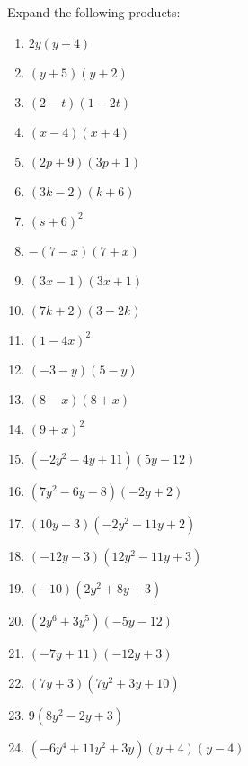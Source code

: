 \begin{exercises}{}
{
Expand the following products:
\begin{multicols}{2}
\begin{enumerate}[label=\textbf{\arabic*}., itemsep=5pt]
\item $2y(y+4)$ 
\item $(y+5)(y+2) $
\item $(2-t)(1-2t)$
\item $(x-4)(x+4)$
\item $ (2p+9)(3p+1)$
\item $(3k-2)(k+6)$
\item $(s+6)^2$
\item $-(7-x)(7+x)$
\item $(3x-1)(3x+1)$
\item $(7k+2)(3-2k)$
\item $(1-4x)^2$
\item $(-3-y)(5-y)$
\item $(8-x)(8+x)$
\item $(9+x)^2$
\item $(-2{y}^{2}-4y+11)(5y-12)$ 
\item $(7{y}^{2}-6y-8)(-2y+2)$%
\item $(10{y}+3)(-2{y}^{2}-11y+2)$ 
\item $(-12y-3)(12{y}^{2}-11y+3)$%
\item $(-10)(2{y}^{2}+8y+3)$ 
\item $(2{y}^{6}+3{y}^{5})(-5y-12)$%
\item $(-7y+11)(-12y+3)$%
\item $(7y+3)(7{y}^{2}+3y+10)$%
\item $9(8{y}^{2}-2y+3)$ 
\item $(-6{y}^{4}+11{y}^{2}+3y)(y+4)(y-4)$ 
\end{enumerate}
\end{multicols}

}
\end{exercises}

